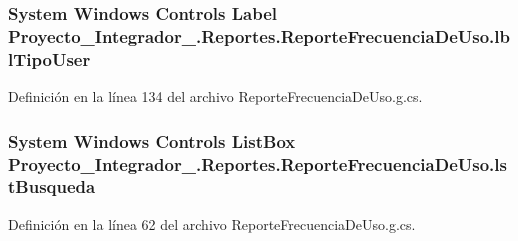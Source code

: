 \hypertarget{class_proyecto___integrador__3_1_1_reportes_1_1_reporte_frecuencia_de_uso_a44722cad98505b8eaad8df7e5ffcee2c}{
\subsubsection[{lbl\-Tipo\-User}]{\setlength{\rightskip}{0pt plus 5cm}System Windows Controls Label Proyecto\-\_\-\-Integrador\-\_.\-Reportes.\-Reporte\-Frecuencia\-De\-Uso.\-lbl\-Tipo\-User\hspace{0.3cm}{\ttfamily [package]}}}\label{class_proyecto___integrador__3_1_1_reportes_1_1_reporte_frecuencia_de_uso_a44722cad98505b8eaad8df7e5ffcee2c}


Definición en la línea 134 del archivo Reporte\-Frecuencia\-De\-Uso.\-g.\-cs.

\hypertarget{class_proyecto___integrador__3_1_1_reportes_1_1_reporte_frecuencia_de_uso_a94c9a9f5043efbb40679b90827da897e}{
\subsubsection[{lst\-Busqueda}]{\setlength{\rightskip}{0pt plus 5cm}System Windows Controls List\-Box Proyecto\-\_\-\-Integrador\-\_.\-Reportes.\-Reporte\-Frecuencia\-De\-Uso.\-lst\-Busqueda\hspace{0.3cm}{\ttfamily [package]}}}\label{class_proyecto___integrador__3_1_1_reportes_1_1_reporte_frecuencia_de_uso_a94c9a9f5043efbb40679b90827da897e}


Definición en la línea 62 del archivo Reporte\-Frecuencia\-De\-Uso.\-g.\-cs.


